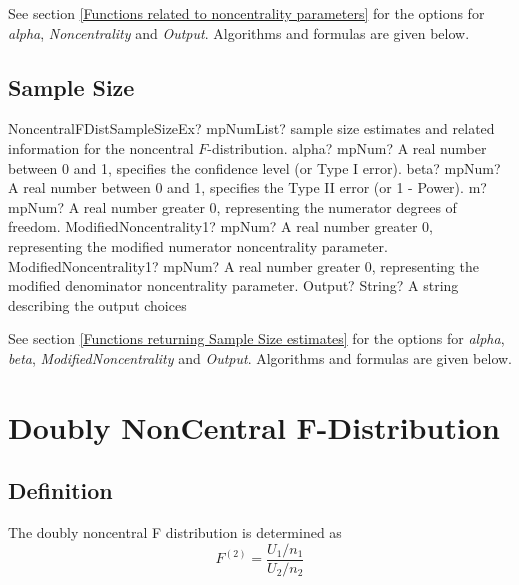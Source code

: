 \vspace{0.3cm}
See section \ref{Functions related to noncentrality parameters} for the options for  {\itshape\sffamily alpha}, {\itshape\sffamily Noncentrality} and {\itshape\sffamily Output}. Algorithms and formulas are given below.




\subsection{Sample Size}
\label{NonCentralFDistributionSampleSize}


\begin{mpFunctionsExtract}
	\mpFunctionSixNotImplemented
	{NoncentralFDistSampleSizeEx? mpNumList? sample size estimates and related information for the noncentral $F$-distribution.}
	{alpha? mpNum? A real number between 0 and 1, specifies the confidence level (or Type I error).}
	{beta? mpNum?  A real number between 0 and 1, specifies the Type II error (or 1 - Power).}
	{m? mpNum? A real number greater 0, representing the numerator  degrees of freedom.}
	{ModifiedNoncentrality1? mpNum? A real number greater 0, representing the modified numerator noncentrality parameter.}
	{ModifiedNoncentrality1? mpNum? A real number greater 0, representing the modified denominator noncentrality parameter.}
	{Output? String? A string describing the output choices}
\end{mpFunctionsExtract}


\vspace{0.3cm}
See section \ref{Functions returning Sample Size estimates} for the options for  {\itshape\sffamily alpha}, {\itshape\sffamily beta}, {\itshape\sffamily ModifiedNoncentrality} and {\itshape\sffamily Output}. Algorithms and formulas are given below.






\newpage
\section{Doubly NonCentral F-Distribution}
\label{DoublyNonCentralFDistribution}

\subsection{Definition}
\label{DoublyNonCentralFDistributionDefinition}
The doubly noncentral F distribution is determined as
\begin{equation}
	F^{(2)} = \frac{U_1/n_1}{U_2/n_2}
\end{equation}

